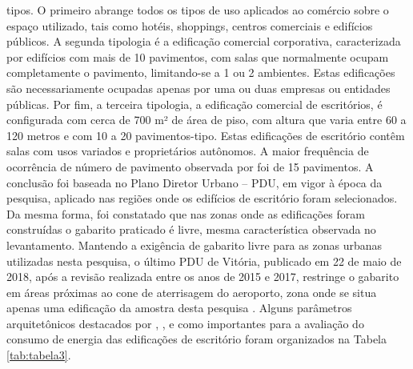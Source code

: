 tipos. O primeiro abrange todos os tipos de uso aplicados ao comércio sobre o espaço 
utilizado, tais como hotéis, shoppings, centros comerciais e edifícios públicos. A 
segunda tipologia é a edificação comercial corporativa, caracterizada por edifícios com 
mais de 10 pavimentos, com salas que normalmente ocupam completamente o pavimento, 
limitando-se a 1 ou 2 ambientes. Estas edificações são necessariamente ocupadas apenas 
por uma ou duas empresas ou entidades públicas. Por fim, a terceira tipologia, a 
edificação comercial de escritórios, é configurada com cerca de 700 m² de área de piso, 
com altura que varia entre 60 a 120 metros e com 10 a 20 pavimentos-tipo. Estas 
edificações de escritório contêm salas com usos variados e proprietários autônomos.\vspace*{0.3cm}\newline
A maior frequência de ocorrência de número de pavimento observada por \textcite{Bernabe2012}
foi de 15 pavimentos. A conclusão foi baseada no Plano Diretor Urbano – PDU, em 
vigor à época da pesquisa, aplicado nas regiões onde os edifícios de escritório 
foram selecionados. Da mesma forma, foi constatado que nas zonas onde as edificações 
foram construídas o gabarito praticado é livre, mesma característica observada no 
levantamento. Mantendo a exigência de gabarito livre para as zonas urbanas utilizadas 
nesta pesquisa, o último PDU de Vitória, publicado em 22 de maio de 2018, após a 
revisão realizada entre os anos de 2015 e 2017, restringe o gabarito em áreas 
próximas ao cone de aterrisagem do aeroporto, zona onde se situa apenas uma 
edificação da amostra desta pesquisa \cite{PrefeituraMunicipaldeVitoria-PMV2018}.\vspace*{0.3cm}\newline
Alguns parâmetros arquitetônicos destacados por \textcite{Lamberts2006}, 
\textcite{Bernabe2012}, e \textcite{Fonseca2016} como importantes para a avaliação do 
consumo de energia das edificações de escritório foram organizados na Tabela \ref{tab:tabela3}.\newline
